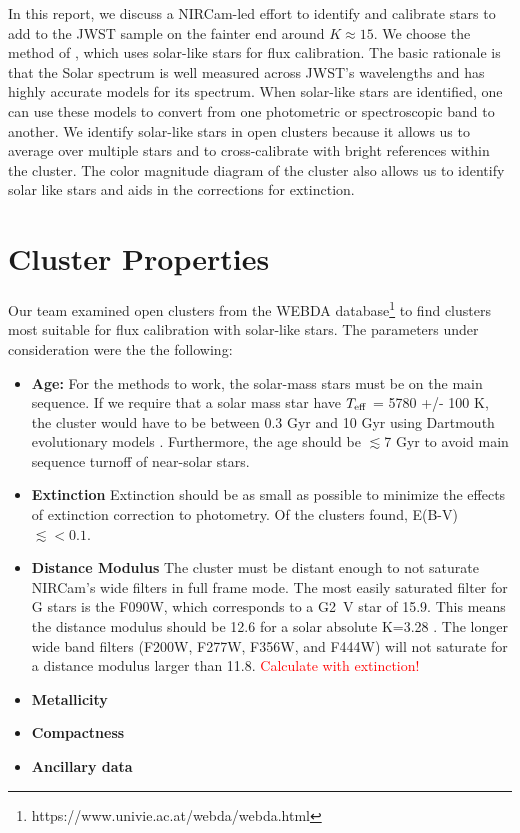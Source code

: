 \documentclass{aastex6}
\begin{document}
In this report, we discuss a NIRCam-led effort to identify and calibrate stars to add to the JWST sample on the fainter end around $K \approx 15$.
We choose the method of \citet{rieke2008absIRcal}, which uses solar-like stars for flux calibration.
The basic rationale is that the Solar spectrum is well measured across JWST's wavelengths \citep[0.6~$\mu$m to 29~$\mu$m][]{gardner2006SSRv} and has highly accurate models for its spectrum.
When solar-like stars are identified, one can use these models to convert from one photometric or spectroscopic band to another.
We identify solar-like stars in open clusters because it allows us to average over multiple stars and to cross-calibrate with bright references within the cluster.
The color magnitude diagram of the cluster also allows us to identify solar like stars and aids in the corrections for extinction.

\section{Cluster Properties}

Our team examined open clusters from the WEBDA database\footnote{https://www.univie.ac.at/webda/webda.html} to find clusters most suitable for flux calibration with solar-like stars.
The parameters under consideration were the the following:
\begin{itemize}
\item {\bf Age:} For the methods to work, the solar-mass stars must be on the main sequence. If we require that a solar mass star have $T_{\rm eff}$ = 5780 +/- 100 K, the cluster would have to be between 0.3 Gyr and 10 Gyr using Dartmouth evolutionary models \citep{dotter2008dartmouth}. Furthermore, the age should be $\lesssim$7 Gyr to avoid main sequence turnoff of near-solar stars.
\item {\bf Extinction} Extinction should be as small as possible to minimize the effects of extinction correction to photometry. Of the clusters found, E(B-V) $\lesssim < 0.1$.
\item {\bf Distance Modulus} The cluster must be distant enough to not saturate NIRCam's wide filters in full frame mode. The most easily saturated filter for G stars is the F090W, which corresponds to a G2~V star of 15.9. This means the distance modulus should be 12.6 for a solar absolute K=3.28 \citep{binney1998book}.
The longer wide band filters (F200W, F277W, F356W, and F444W) will not saturate for a distance modulus larger than 11.8.
\textcolor{red}{Calculate with extinction!}
\item {\bf Metallicity}
\item {\bf Compactness}
\item {\bf Ancillary data}
\end{itemize}
\end{document}
